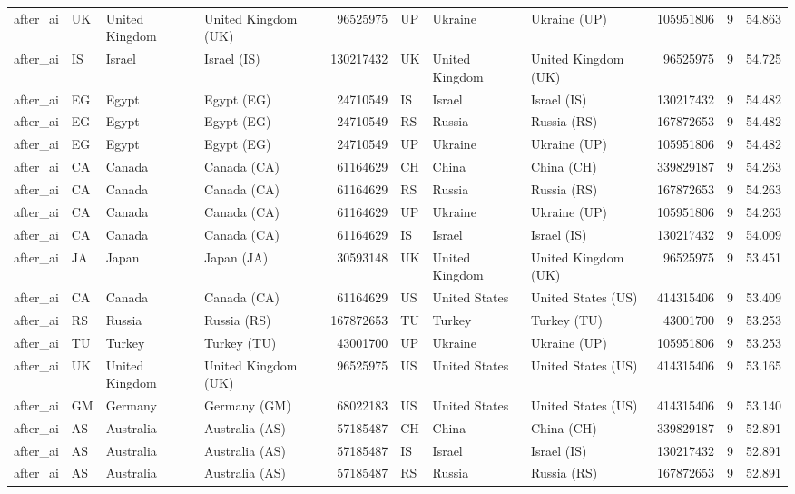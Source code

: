 \begin{tabular}{llllrlllrrr}
after\_ai & UK & United Kingdom & United Kingdom (UK) & 96525975 & UP & Ukraine & Ukraine (UP) & 105951806 & 9 & 54.863 \\
after\_ai & IS & Israel & Israel (IS) & 130217432 & UK & United Kingdom & United Kingdom (UK) & 96525975 & 9 & 54.725 \\
after\_ai & EG & Egypt & Egypt (EG) & 24710549 & IS & Israel & Israel (IS) & 130217432 & 9 & 54.482 \\
after\_ai & EG & Egypt & Egypt (EG) & 24710549 & RS & Russia & Russia (RS) & 167872653 & 9 & 54.482 \\
after\_ai & EG & Egypt & Egypt (EG) & 24710549 & UP & Ukraine & Ukraine (UP) & 105951806 & 9 & 54.482 \\
after\_ai & CA & Canada & Canada (CA) & 61164629 & CH & China & China (CH) & 339829187 & 9 & 54.263 \\
after\_ai & CA & Canada & Canada (CA) & 61164629 & RS & Russia & Russia (RS) & 167872653 & 9 & 54.263 \\
after\_ai & CA & Canada & Canada (CA) & 61164629 & UP & Ukraine & Ukraine (UP) & 105951806 & 9 & 54.263 \\
after\_ai & CA & Canada & Canada (CA) & 61164629 & IS & Israel & Israel (IS) & 130217432 & 9 & 54.009 \\
after\_ai & JA & Japan & Japan (JA) & 30593148 & UK & United Kingdom & United Kingdom (UK) & 96525975 & 9 & 53.451 \\
after\_ai & CA & Canada & Canada (CA) & 61164629 & US & United States & United States (US) & 414315406 & 9 & 53.409 \\
after\_ai & RS & Russia & Russia (RS) & 167872653 & TU & Turkey & Turkey (TU) & 43001700 & 9 & 53.253 \\
after\_ai & TU & Turkey & Turkey (TU) & 43001700 & UP & Ukraine & Ukraine (UP) & 105951806 & 9 & 53.253 \\
after\_ai & UK & United Kingdom & United Kingdom (UK) & 96525975 & US & United States & United States (US) & 414315406 & 9 & 53.165 \\
after\_ai & GM & Germany & Germany (GM) & 68022183 & US & United States & United States (US) & 414315406 & 9 & 53.140 \\
after\_ai & AS & Australia & Australia (AS) & 57185487 & CH & China & China (CH) & 339829187 & 9 & 52.891 \\
after\_ai & AS & Australia & Australia (AS) & 57185487 & IS & Israel & Israel (IS) & 130217432 & 9 & 52.891 \\
after\_ai & AS & Australia & Australia (AS) & 57185487 & RS & Russia & Russia (RS) & 167872653 & 9 & 52.891 \\

\end{tabular}
